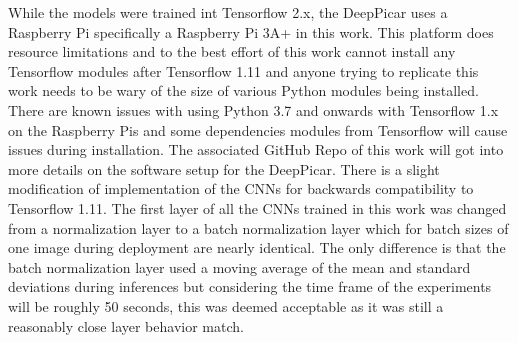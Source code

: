 \documentclass[conference]{IEEEtran}
\begin{document}
While the models were trained int Tensorflow 2.x, the DeepPicar uses a Raspberry Pi specifically a Raspberry Pi 3A+ in this work. This platform does resource limitations and to the best effort of this work cannot install any Tensorflow modules after Tensorflow 1.11 and anyone trying to replicate this work needs to be wary of the size of various Python modules being installed. There are known issues with using Python 3.7 and onwards with Tensorflow 1.x on the Raspberry Pis and some dependencies modules from Tensorflow will cause issues during installation. The associated GitHub Repo of this work will got into more details on the software setup for the DeepPicar. There is a slight modification of implementation of the CNNs for backwards compatibility to Tensorflow 1.11. The first layer of all the CNNs trained in this work was changed from a normalization layer to a batch normalization layer which for batch sizes of one image during deployment are nearly identical. The only difference is that the batch normalization layer used a moving average of the mean and standard deviations during inferences but considering the time frame of the experiments will be roughly 50 seconds, this was deemed acceptable as it was still a reasonably close layer behavior match.
\end{document}
